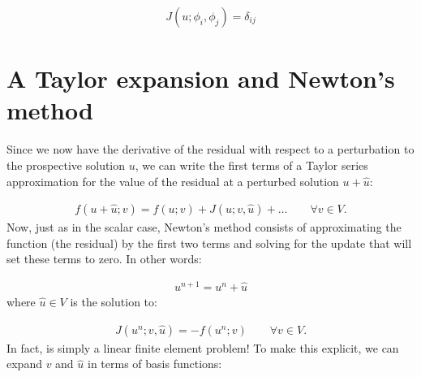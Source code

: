 \documentclass{book}
\begin{document}
\label{\detokenize{8_nonlinear_problems:equation-8_nonlinear_problems:5}}\begin{equation}\label{equation:8_nonlinear_problems:8_nonlinear_problems:5}
\begin{split}J(u; \phi_i, \phi_j) = \delta_{ij}\end{split}
\end{equation}

\section{A Taylor expansion and Newton’s method}
\label{\detokenize{8_nonlinear_problems:a-taylor-expansion-and-newton-s-method}}
Since we now have the derivative of the residual with respect to a
perturbation to the prospective solution \(u\), we can write the first
terms of a Taylor series approximation for the value of the residual at a perturbed solution \(u+\hat{u}\):

\label{\detokenize{8_nonlinear_problems:equation-8_nonlinear_problems:6}}\begin{equation}\label{equation:8_nonlinear_problems:8_nonlinear_problems:6}
\begin{split}f(u+\hat{u}; v) = f(u; v) + J(u; v, \hat{u}) +\ldots \qquad \forall v\in V.\end{split}
\end{equation}
Now, just as in the scalar case, Newton’s method consists of
approximating the function (the residual) by the first two terms and
solving for the update that will set these terms to zero. In other
words:

\label{\detokenize{8_nonlinear_problems:equation-8_nonlinear_problems:7}}\begin{equation}\label{equation:8_nonlinear_problems:8_nonlinear_problems:7}
\begin{split}u^{n+1} = u^n + \hat{u}\end{split}
\end{equation}
where \(\hat{u} \in V\) is the solution to:

\label{\detokenize{8_nonlinear_problems:equation-newton_update}}\begin{equation}\label{equation:8_nonlinear_problems:newton_update}
\begin{split}J(u^n; v, \hat{u}) = - f(u^n; v) \qquad \forall v \in V.\end{split}
\end{equation}
In fact, {\hyperref[\detokenize{8_nonlinear_problems:equation-newton_update}]{}} is simply a linear finite element
problem! To make this explicit, we can expand \(v\) and \(\hat{u}\) in
terms of basis functions:
\end{document}
